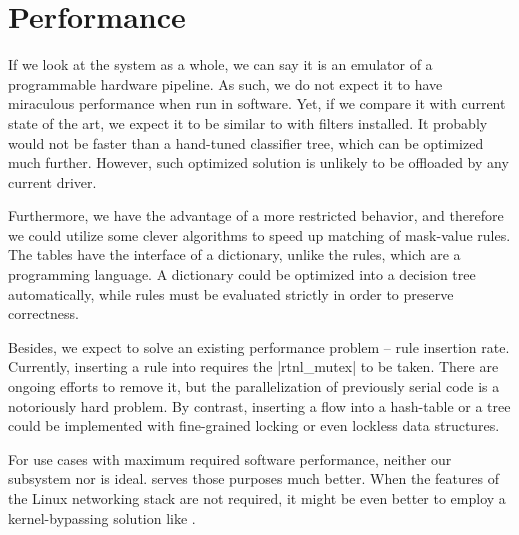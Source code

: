 \section{Performance}

If we look at the system as a whole, we can say it is an emulator of
a programmable hardware pipeline. As such, we do not expect it to have
miraculous performance when run in software. Yet, if we compare it with
current state of the art, we expect it to be similar to  with 
filters installed. It probably would not be faster than a hand-tuned 
classifier tree, which can be optimized much further. However, such optimized
solution is unlikely to be offloaded by any current driver.

Furthermore, we have the advantage of a more restricted behavior, and therefore
we could utilize some clever algorithms to speed up matching of mask-value
rules. The tables have the interface of a dictionary, unlike the  rules, which are
a programming language. A dictionary could be optimized into a decision tree
automatically, while  rules must be evaluated strictly in order to
preserve correctness.

Besides, we expect to solve an existing performance problem -- rule insertion rate.
Currently, inserting a rule into  requires the \struct|rtnl_mutex| to be
taken. There are ongoing efforts to remove it, but the
parallelization of previously serial code is a notoriously hard problem. By
contrast, inserting a flow into a hash-table or a tree could be implemented
with fine-grained locking or even lockless data structures.

For use cases with maximum required software performance, neither our subsystem nor
 is ideal.  serves those purposes much better. When the features
of the Linux networking stack are not required, it might be even better to
employ a kernel-bypassing solution like .

